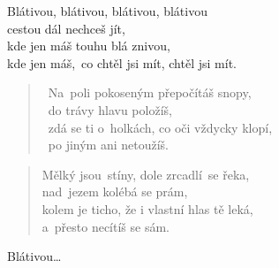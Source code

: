 \begin{song}{}
\begin{refren}
   Blátivou, blátivou, blátivou, blátivou \\
   cestou dál nechceš jít, \\
   kde jen máš touhu blá znivou, \\
   kde jen máš,~co chtěl jsi mít, chtěl jsi mít. 
\end{refren}
\begin{verse}
   ~Na~poli pokoseným přepočítáš snopy, \\
   ~do trávy hlavu položíš, \\
   ~zdá se ti o~holkách, co oči vždycky klopí, \\
   ~po jiným ani netoužíš.
\end{verse}
\begin{verse}
   Mělký jsou~stíny, dole zrcadlí~se řeka, \\
   nad~jezem kolébá se prám, \\
   kolem je ticho, že i vlastní hlas tě leká, \\
   a~přesto necítíš se sám.
\end{verse}
\begin{refren}
    Blátivou\ldots~
\end{refren}
\end{song}
\pagebreak
